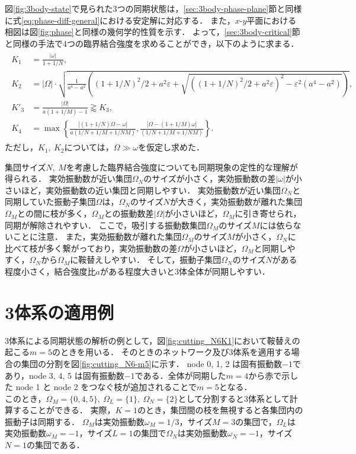 \documentclass[../main]{subfiles}
\begin{document}
図\ref{fig:3body-state}で見られた3つの同期状態は，\ref{sec:3body-phase-plane}節と同様に式\eqref{eq:phase-diff-general}における安定解に対応する．
また，$x$-$y$平面における相図は図\ref{fig:phase}と同様の幾何学的性質を示す．
よって，\ref{sec:3body-critical}節と同様の手法で4つの臨界結合強度を求めることができ，以下のように求まる．
\begin{align}
    \begin{split}
        K_1&=\frac{|\omega|}{1+1/N},\\
        K_2&=|\Omega|\cdot\sqrt{\frac{1}{a^4-a^2}\left((1+1/N)^2/2+a^2\varepsilon+\sqrt{((1+1/N)^2/2+a^2\varepsilon)^2-\varepsilon^2(a^4-a^2)}\right)},\\
        K'_3&=\frac{|\Omega|}{a(1+1/M)-1}\gtrapprox K_3,\\
        K_4&=\max\left\{\frac{|(1+1/N)\Omega-\omega|}{a(1/N+1/M+1/NM)},\frac{|\Omega-(1+1/M)\omega|}{(1/N+1/M+1/NM)}\right\}.
    \end{split}
\end{align}
ただし，$K_1,\ K_2$については，$\Omega\gg\omega$を仮定し求めた．

集団サイズ$N,\ M$を考慮した臨界結合強度についても同期現象の定性的な理解が得られる．
実効振動数が近い集団$\Omega_N$のサイズが小さく，実効振動数の差$|\omega|$が小さいほど，実効振動数の近い集団と同期しやすい．
実効振動数が近い集団$\Omega_N$と同期していた振動子集団$\Omega$は，$\Omega_N$のサイズ$N$が大きく，実効振動数が離れた集団$\Omega_M$との間に枝が多く，$\Omega_M$との振動数差$|\Omega|$が小さいほど，$\Omega_M$に引き寄せられ，同期が解除されやすい．
ここで，吸引する振動数集団$\Omega_M$のサイズ$M$には依らないことに注意．
また，実効振動数が離れた集団$\Omega_M$のサイズ$M$が小さく，$\Omega_N$に比べて枝が多く繋がっており，実効振動数の差$\Omega$が小さいほど，$\Omega_M$と同期しやすく，$\Omega_N$から$\Omega_M$に鞍替えしやすい．
そして，振動子集団$\Omega_N$のサイズ$N$がある程度小さく，結合強度比$a$がある程度大きいと3体全体が同期しやすい．

\section{3体系の適用例}
3体系による同期状態の解析の例として，図\ref{fig:cutting_N6K1}において鞍替えの起こる$m=5$のときを用いる．
そのときのネットワーク及び3体系を適用する場合の集団の分割を図\ref{fig:cutting_N6-m5}に示す．
node 0, 1, 2 は固有振動数$-1$であり，node 3, 4, 5 は固有振動数$-1$である．全体が同期した$m=4$から赤で示した node 1 と node 2 をつなぐ枝が追加されることで$m=5$となる．\\
このとき，$\Omega_M=\{0,4,5\},\ \Omega_L=\{1\},\ \Omega_N=\{2\}$として分割すると3体系として計算することができる．
実際，$K=1$のとき，集団間の枝を無視すると各集団内の振動子は同期する．
$\Omega_M$は実効振動数$\omega_M=1/3$，サイズ$M=3$の集団で，$\Omega_L$は実効振動数$\omega_M=-1$，サイズ$L=1$の集団で$\Omega_N$は実効振動数$\omega_N=-1$，サイズ$N=1$の集団である．
\end{document}
